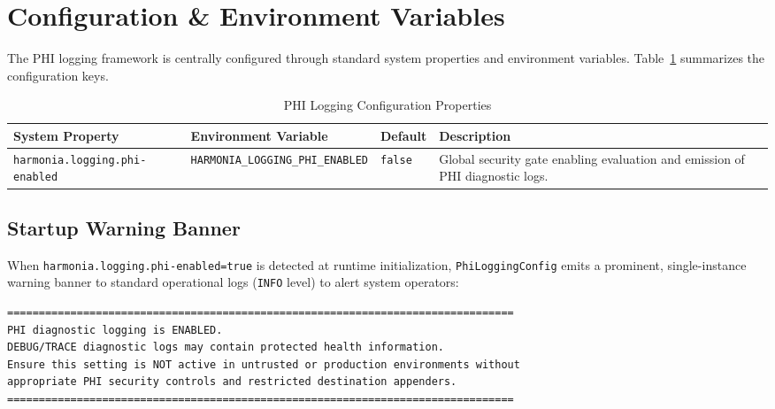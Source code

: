 \section{Configuration \& Environment Variables}
\label{sec:phi_config}

The PHI logging framework is centrally configured through standard system properties and environment variables. Table~\ref{tab:phi_config_properties} summarizes the configuration keys.

\begin{table}[htbp]
\centering
\small
\begin{tabularx}{\textwidth}{l l l X}
\toprule
\textbf{System Property} & \textbf{Environment Variable} & \textbf{Default} & \textbf{Description} \\
\midrule
\texttt{harmonia.logging.phi-enabled} & \texttt{HARMONIA\_LOGGING\_PHI\_ENABLED} & \texttt{false} & Global security gate enabling evaluation and emission of PHI diagnostic logs. \\
\bottomrule
\end{tabularx}
\caption{PHI Logging Configuration Properties}
\label{tab:phi_config_properties}
\end{table}

\subsection{Startup Warning Banner}

When \texttt{harmonia.logging.phi-enabled=true} is detected at runtime initialization, \texttt{PhiLoggingConfig} emits a prominent, single-instance warning banner to standard operational logs (\texttt{INFO} level) to alert system operators:

\begin{lstlisting}[language=TeX, numbers=none, caption={Operational Startup Warning Banner for PHI Logging}]
================================================================================
PHI diagnostic logging is ENABLED.
DEBUG/TRACE diagnostic logs may contain protected health information.
Ensure this setting is NOT active in untrusted or production environments without
appropriate PHI security controls and restricted destination appenders.
================================================================================
\end{lstlisting}

